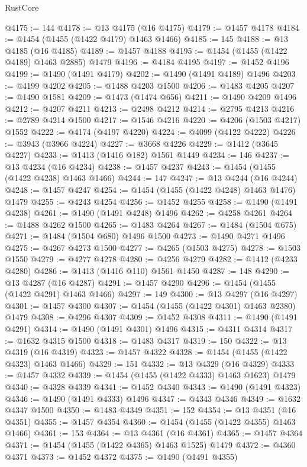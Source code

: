 \begin{lexlean}{RustCore}
\begin{coremodule}
@4175 := 144
@4178 := @13 @4175 (@16 @4175)
@4179 := @1457 @4178
@4184 := @1454 (@1455 (@1422 @4179) @1463 @1466)
@4185 := 145
@4188 := @13 @4185 (@16 @4185)
@4189 := @1457 @4188
@4195 := @1454 (@1455 (@1422 @4189) @1463 @2885) @1479
@4196 := @4184 @4195
@4197 := @1452 @4196
@4199 := @1490 (@1491 @4179)
@4202 := @1490 (@1491 @4189) @1496
@4203 := @4199 @4202
@4205 := @1488 @4203 @1500
@4206 := @1483 @4205
@4207 := @1490 @1581
@4209 := @1473 (@1474 @656)
@4211 := @1490 @4209 @1496
@4212 := @4207 @4211
@4213 := @2498 @4212
@4214 := @2795 @4213
@4216 := @2789 @4214 @1500
@4217 := @1546 @4216
@4220 := @4206 (@1503 @4217) @1552
@4222 := @4174 (@4197 @4220)
@4224 := @4099 (@4122 @4222)
@4226 := @3943 (@3966 @4224)
@4227 := @3668 @4226
@4229 := @1412 (@3645 @4227)
@4233 := @1413 (@1416 @182) @1561 @1449
@4234 := 146
@4237 := @13 @4234 (@16 @4234)
@4238 := @1457 @4237
@4243 := @1454 (@1455 (@1422 @4238) @1463 @1466)
@4244 := 147
@4247 := @13 @4244 (@16 @4244)
@4248 := @1457 @4247
@4254 := @1454 (@1455 (@1422 @4248) @1463 @1476) @1479
@4255 := @4243 @4254
@4256 := @1452 @4255
@4258 := @1490 (@1491 @4238)
@4261 := @1490 (@1491 @4248) @1496
@4262 := @4258 @4261
@4264 := @1488 @4262 @1500
@4265 := @1483 @4264
@4267 := @1484 (@1504 @675)
@4271 := @1484 (@1504 @680) @1496 @1500
@4273 := @1490 @4271 @1496
@4275 := @4267 @4273 @1500
@4277 := @4265 (@1503 @4275)
@4278 := @1503 @1550
@4279 := @4277 @4278
@4280 := @4256 @4279
@4282 := @1412 (@4233 @4280)
@4286 := @1413 (@1416 @110) @1561 @1450
@4287 := 148
@4290 := @13 @4287 (@16 @4287)
@4291 := @1457 @4290
@4296 := @1454 (@1455 (@1422 @4291) @1463 @1466)
@4297 := 149
@4300 := @13 @4297 (@16 @4297)
@4301 := @1457 @4300
@4307 := @1454 (@1455 (@1422 @4301) @1463 @2380) @1479
@4308 := @4296 @4307
@4309 := @1452 @4308
@4311 := @1490 (@1491 @4291)
@4314 := @1490 (@1491 @4301) @1496
@4315 := @4311 @4314
@4317 := @1632 @4315 @1500
@4318 := @1483 @4317
@4319 := 150
@4322 := @13 @4319 (@16 @4319)
@4323 := @1457 @4322
@4328 := @1454 (@1455 (@1422 @4323) @1463 @1466)
@4329 := 151
@4332 := @13 @4329 (@16 @4329)
@4333 := @1457 @4332
@4339 := @1454 (@1455 (@1422 @4333) @1463 @1623) @1479
@4340 := @4328 @4339
@4341 := @1452 @4340
@4343 := @1490 (@1491 @4323)
@4346 := @1490 (@1491 @4333) @1496
@4347 := @4343 @4346
@4349 := @1632 @4347 @1500
@4350 := @1483 @4349
@4351 := 152
@4354 := @13 @4351 (@16 @4351)
@4355 := @1457 @4354
@4360 := @1454 (@1455 (@1422 @4355) @1463 @1466)
@4361 := 153
@4364 := @13 @4361 (@16 @4361)
@4365 := @1457 @4364
@4371 := @1454 (@1455 (@1422 @4365) @1463 @1525) @1479
@4372 := @4360 @4371
@4373 := @1452 @4372
@4375 := @1490 (@1491 @4355)

\end{coremodule}
\end{lexlean}

